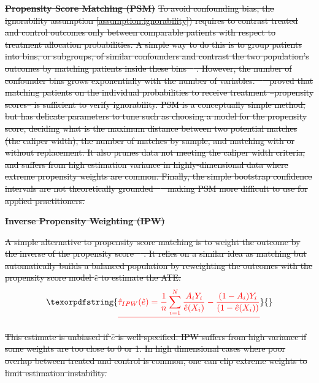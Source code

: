 \documentclass[10pt,letterpaper]{article}
\providecommand{\DIFdeltex}[1]{{\protect\color{red}\sout{#1}}}                      %
\providecommand{\DIFdel}[1]{\texorpdfstring{\DIFdeltex{#1}}{}} %
\begin{document}
\textbf{\DIFdel{Propensity Score Matching (PSM)}} %
\DIFdel{To avoid confounding bias, the
  ignorability assumption \ref{assumption:ignorability}) requires to contrast
  treated and control outcomes only between comparable patients with respect to
  treatment allocation probabilities. A simple way to do this is to group
  patients into bins, or subgroups, of similar confounders and contrast the two
  population's outcomes by matching patients inside these bins
  \mbox{%
    \cite{stuart2010matching}}\hskip0pt%
  . However, the number of confounder bins grows
  exponentially with the number of variables. \mbox{%
    \cite{rosenbaum1983central} }\hskip0pt%
  proved
  that matching patients on the individual probabilities to receive treatment
  --propensity scores-- is sufficient to verify ignorability. PSM is a
  conceptually simple method, but has delicate parameters to tune such as
  choosing a model for the propensity score, deciding what is the maximum
  distance between two potential matches (the caliper width), the number of
  matches by sample, and matching with or without replacement. It also prunes data
  not meeting the caliper width criteria, and suffers from high estimation
  variance in highly-dimensional data where extreme propensity weights are common.
  Finally, the simple bootstrap confidence intervals are not theoretically
  grounded \mbox{%
    \cite{abadie2008failure} }\hskip0pt%
  making PSM more difficult
  to use for applied practitioners.}%

\textbf{\DIFdel{Inverse Propensity Weighting (IPW)}}

\DIFdel{A simple alternative to propensity score matching is to weight the outcome by
  the inverse of the propensity score \mbox{%
    \cite{austin2015moving}}\hskip0pt%
  . It relies on a
  similar idea as matching but automatically builds a balanced population by
  reweighting the outcomes with the propensity score model $\hat{e}$ to estimate
  the ATE:
}\begin{displaymath}
  \DIFdel{\hat \tau_{IPW}(\hat e) = \frac{1}{n} \sum_{i=1}^N \frac{A_i Y_i}{\hat e(X_i)} - \frac{(1-A_i)Y_i}{(1-\hat e(X_i))}
  }\end{displaymath}%

\DIFdel{This estimate is unbiased if $\hat e$ is well-specified. IPW suffers from high
  variance if some weights are too close to 0 or 1. In high dimensional cases
  where poor overlap between treated and control is common, one can clip extreme
  weights to limit estimation instability.}%
\end{document}
